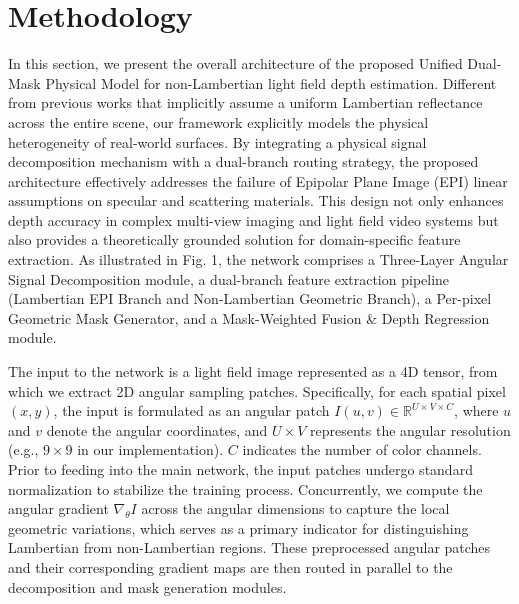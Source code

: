 \documentclass[lettersize,journal]{IEEEtran}
\begin{document}
\section{Methodology}

In this section, we present the overall architecture of the proposed Unified Dual-Mask Physical Model for non-Lambertian light field depth estimation. Different from previous works that implicitly assume a uniform Lambertian reflectance across the entire scene, our framework explicitly models the physical heterogeneity of real-world surfaces. By integrating a physical signal decomposition mechanism with a dual-branch routing strategy, the proposed architecture effectively addresses the failure of Epipolar Plane Image (EPI) linear assumptions on specular and scattering materials. This design not only enhances depth accuracy in complex multi-view imaging and light field video systems but also provides a theoretically grounded solution for domain-specific feature extraction. As illustrated in Fig. 1, the network comprises a Three-Layer Angular Signal Decomposition module, a dual-branch feature extraction pipeline (Lambertian EPI Branch and Non-Lambertian Geometric Branch), a Per-pixel Geometric Mask Generator, and a Mask-Weighted Fusion \& Depth Regression module.

The input to the network is a light field image represented as a 4D tensor, from which we extract 2D angular sampling patches. Specifically, for each spatial pixel $(x, y)$, the input is formulated as an angular patch $I(u,v) \in \mathbb{R}^{U \times V \times C}$, where $u$ and $v$ denote the angular coordinates, and $U \times V$ represents the angular resolution (e.g., $9 \times 9$ in our implementation). $C$ indicates the number of color channels. Prior to feeding into the main network, the input patches undergo standard normalization to stabilize the training process. Concurrently, we compute the angular gradient $\nabla_{\theta} I$ across the angular dimensions to capture the local geometric variations, which serves as a primary indicator for distinguishing Lambertian from non-Lambertian regions. These preprocessed angular patches and their corresponding gradient maps are then routed in parallel to the decomposition and mask generation modules.
\end{document}
